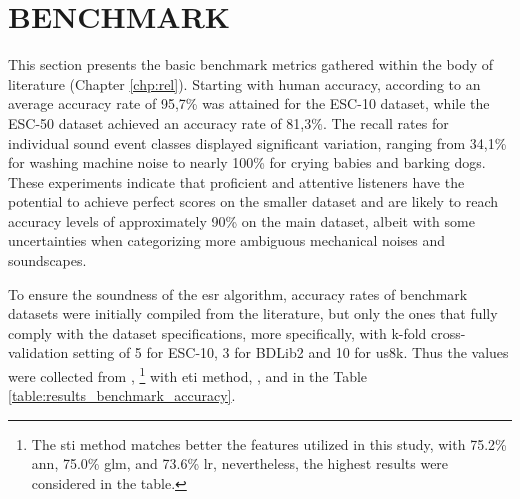 \section{BENCHMARK}
\label{sec:results_metrics}


This section presents the basic benchmark metrics gathered within the body of literature (Chapter \ref{chp:rel}). Starting with human accuracy, according to \textcite{PiczakESC2015} an average accuracy rate of 95,7\% was attained for the ESC-10 dataset, while the ESC-50 dataset achieved an accuracy rate of 81,3\%. The recall rates for individual sound event classes displayed significant variation, ranging from 34,1\% for washing machine noise to nearly 100\% for crying babies and barking dogs. These experiments indicate that proficient and attentive listeners have the potential to achieve perfect scores on the smaller dataset and are likely to reach accuracy levels of approximately 90\% on the main dataset, albeit with some uncertainties when categorizing more ambiguous mechanical noises and soundscapes.

To ensure the soundness of the \gls{esr} algorithm, accuracy rates of benchmark datasets were initially compiled from the literature, but only the ones that fully comply with the dataset specifications, more specifically, with k-fold cross-validation setting of 5 for ESC-10, 3 for BDLib2 and 10 for \gls{us8k}. Thus the values were collected from \textcite{PiczakESC2015}, \textcite{Bountourakis2019}\footnote{The \gls{sti} method matches better the features utilized in this study, with 75.2\% \gls{ann}, 75.0\% \gls{glm}, and 73.6\% \gls{lr}, nevertheless, the highest results were considered in the table.} with \gls{eti} method,  \textcite{Salamon2014}, and \textcite{Vandendriessche2021} in the Table \ref{table:results_benchmark_accuracy}.

